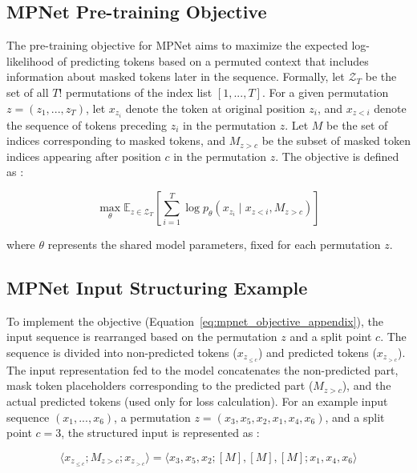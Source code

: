\documentclass[10pt,oneside]{report}
\begin{document}
\subsection{MPNet Pre-training Objective}

The pre-training objective for MPNet aims to maximize the expected log-likelihood of predicting tokens based on a permuted context that includes information about masked tokens later in the sequence. Formally, let $\mathcal{Z}_{T}$ be the set of all $T!$ permutations of the index list $[1,...,T]$. For a given permutation $z=(z_{1},...,z_{T})$, let $x_{z_{i}}$ denote the token at original position $z_i$, and $x_{z<i}$ denote the sequence of tokens preceding $z_i$ in the permutation $z$. Let $M$ be the set of indices corresponding to masked tokens, and $M_{z>c}$ be the subset of masked token indices appearing after position $c$ in the permutation $z$. The objective is defined as \cite{song2020mpnet}:

\begin{equation} \label{eq:mpnet_objective_appendix}
\max_{\theta} \mathbb{E}_{z\in\mathcal{Z}_{T}} \left[ \sum_{i=1}^{T} \log p_{\theta}(x_{z_{i}} \mid x_{z<i}, M_{z>c}) \right]
\end{equation}

where $\theta$ represents the shared model parameters, fixed for each permutation $z$.


\subsection{MPNet Input Structuring Example}

To implement the objective (Equation~\ref{eq:mpnet_objective_appendix}), the input sequence is rearranged based on the permutation $z$ and a split point $c$. The sequence is divided into non-predicted tokens ($x_{z_{\le c}}$) and predicted tokens ($x_{z_{>c}}$). The input representation fed to the model concatenates the non-predicted part, mask token placeholders corresponding to the predicted part ($M_{z>c}$), and the actual predicted tokens (used only for loss calculation). For an example input sequence $(x_1, ..., x_6)$, a permutation $z=(x_3, x_5, x_2, x_1, x_4, x_6)$, and a split point $c=3$, the structured input is represented as \cite{song2020mpnet}:

\begin{equation} \label{eq:mpnet_input_appendix}
\langle x_{z_{\le c}}; M_{z>c}; x_{z_{>c}} \rangle = \langle x_3, x_5, x_2; [M], [M], [M]; x_1, x_4, x_6 \rangle
\end{equation}
\end{document}
